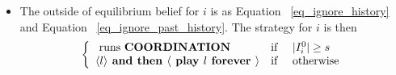 \documentclass[12pt]{article}
\theoremstyle{remark}
\theoremstyle{remark}
\begin{document}
\begin{itemize}
\item The outside of equilibrium belief for $i$ is as Equation ~\ref{eq_ignore_history} and Equation ~\ref{eq_ignore_past_history}. The strategy for $i$ is then
\[\left\{
\begin{array}{l r l}      
    \text{ runs \textbf{COORDINATION}} & \text{if } &|I^{0}_i|\geq s \\
    \langle l \rangle \textbf{ and then $\langle$ play $l$ forever $\rangle$} &\text{if } & \text{otherwise}
\end{array}\right.
\]

\end{itemize}
\end{document}
